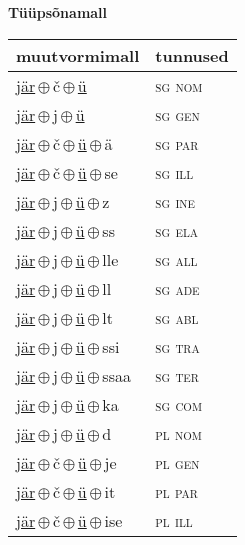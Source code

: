 

\vspace{3.5em}
\noindent \begin{minipage}{\textwidth}
\noindent \textbf{Tüüpsõnamall \,}\\

\begin{sideways}
\begin{tabular}{l l}
muutvormimall & tunnused \\
\hline
\underline{jär}\,$\oplus$\,č\,$\oplus$\,\underline{ü} & \textsc{ sg nom } \\
\underline{jär}\,$\oplus$\,j\,$\oplus$\,\underline{ü} & \textsc{ sg gen } \\
\underline{jär}\,$\oplus$\,č\,$\oplus$\,\underline{ü}\,$\oplus$\,ä & \textsc{ sg par } \\
\underline{jär}\,$\oplus$\,č\,$\oplus$\,\underline{ü}\,$\oplus$\,se & \textsc{ sg ill } \\
\underline{jär}\,$\oplus$\,j\,$\oplus$\,\underline{ü}\,$\oplus$\,z & \textsc{ sg ine } \\
\underline{jär}\,$\oplus$\,j\,$\oplus$\,\underline{ü}\,$\oplus$\,ss & \textsc{ sg ela } \\
\underline{jär}\,$\oplus$\,j\,$\oplus$\,\underline{ü}\,$\oplus$\,lle & \textsc{ sg all } \\
\underline{jär}\,$\oplus$\,j\,$\oplus$\,\underline{ü}\,$\oplus$\,ll & \textsc{ sg ade } \\
\underline{jär}\,$\oplus$\,j\,$\oplus$\,\underline{ü}\,$\oplus$\,lt & \textsc{ sg abl } \\
\underline{jär}\,$\oplus$\,j\,$\oplus$\,\underline{ü}\,$\oplus$\,ssi & \textsc{ sg tra } \\
\underline{jär}\,$\oplus$\,j\,$\oplus$\,\underline{ü}\,$\oplus$\,ssaa & \textsc{ sg ter } \\
\underline{jär}\,$\oplus$\,j\,$\oplus$\,\underline{ü}\,$\oplus$\,ka & \textsc{ sg com } \\
\underline{jär}\,$\oplus$\,j\,$\oplus$\,\underline{ü}\,$\oplus$\,d & \textsc{ pl nom } \\
\underline{jär}\,$\oplus$\,č\,$\oplus$\,\underline{ü}\,$\oplus$\,je & \textsc{ pl gen } \\
\underline{jär}\,$\oplus$\,č\,$\oplus$\,\underline{ü}\,$\oplus$\,it & \textsc{ pl par } \\
\underline{jär}\,$\oplus$\,č\,$\oplus$\,\underline{ü}\,$\oplus$\,ise & \textsc{ pl ill } \\

\end{tabular}
\end{sideways}
\end{minipage}
